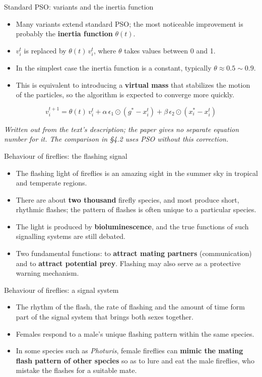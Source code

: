 \documentclass[aspectratio=169,11pt]{beamer}
\newcommand{\hdr}[1]{\gdef\curhdr{#1}}
\gdef\curhdr{}
\begin{document}
\begin{frame}[t]{Standard PSO: variants and the inertia function}
\begin{itemize}\itemsep0.5em
  \item Many variants extend standard PSO; the most noticeable improvement is probably the \textbf{inertia function} $\theta(t)$.
  \item $v_i^t$ is replaced by $\theta(t)\,v_i^t$, where $\theta$ takes values between 0 and 1.
  \item In the simplest case the inertia function is a constant, typically $\theta\approx 0.5\sim 0.9$.
  \item This is equivalent to introducing a \textbf{virtual mass} that stabilizes the motion of the particles, so the algorithm is expected to converge more quickly.
\end{itemize}
\[v_i^{t+1}=\theta(t)\,v_i^{t}+\alpha\,\epsilon_1\odot(g^*-x_i^t)+\beta\,\epsilon_2\odot(x_i^*-x_i^t)\]
{\footnotesize\itshape Written out from the text's description; the paper gives no separate equation number for it. The comparison in \S4.2 uses PSO without this correction.\par}
\end{frame}

\hdr{3 Firefly Algorithm \textperiodcentered{} 3.1 Behaviour of Fireflies}
\begin{frame}[t]{Behaviour of fireflies: the flashing signal}
\begin{itemize}\itemsep0.7em
  \item The flashing light of fireflies is an amazing sight in the summer sky in tropical and temperate regions.
  \item There are about \textbf{two thousand} firefly species, and most produce short, rhythmic flashes; the pattern of flashes is often unique to a particular species.
  \item The light is produced by \textbf{bioluminescence}, and the true functions of such signalling systems are still debated.
  \item Two fundamental functions: to \textbf{attract mating partners} (communication) and to \textbf{attract potential prey}. Flashing may also serve as a protective warning mechanism.
\end{itemize}
\end{frame}

\begin{frame}[t]{Behaviour of fireflies: a signal system}
\begin{itemize}\itemsep0.8em
  \item The rhythm of the flash, the rate of flashing and the amount of time form part of the signal system that brings both sexes together.
  \item Females respond to a male's unique flashing pattern within the same species.
  \item In some species such as \emph{Photuris}, female fireflies can \textbf{mimic the mating flash pattern of other species} so as to lure and eat the male fireflies, who mistake the flashes for a suitable mate.
\end{itemize}
\end{frame}
\end{document}
